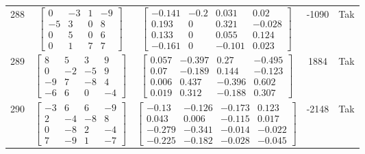 \documentclass[a4paper,12pt]{article}
\begin{document}
\begin{tabular}{c c c c c}
288
&
$\begin{bmatrix} 0 & -3 & 1 & -9 \\ -5 & 3 & 0 & 8 \\ 0 & 5 & 0 & 6 \\ 0 & 1 & 7 & 7 \end{bmatrix}$
&
$\begin{bmatrix} -0.141 & -0.2 & 0.031 & 0.02 \\ 0.193 & 0 & 0.321 & -0.028 \\ 0.133 & 0 & 0.055 & 0.124 \\ -0.161 & 0 & -0.101 & 0.023 \end{bmatrix}$
&
-1090
&
Tak
\\
289
&
$\begin{bmatrix} 8 & 5 & 3 & 9 \\ 0 & -2 & -5 & 9 \\ -9 & 7 & -8 & 4 \\ -6 & 6 & 0 & -4 \end{bmatrix}$
&
$\begin{bmatrix} 0.057 & -0.397 & 0.27 & -0.495 \\ 0.07 & -0.189 & 0.144 & -0.123 \\ 0.006 & 0.437 & -0.396 & 0.602 \\ 0.019 & 0.312 & -0.188 & 0.307 \end{bmatrix}$
&
1884
&
Tak
\\
290
&
$\begin{bmatrix} -3 & 6 & 6 & -9 \\ 2 & -4 & -8 & 8 \\ 0 & -8 & 2 & -4 \\ 7 & -9 & 1 & -7 \end{bmatrix}$
&
$\begin{bmatrix} -0.13 & -0.126 & -0.173 & 0.123 \\ 0.043 & 0.006 & -0.115 & 0.017 \\ -0.279 & -0.341 & -0.014 & -0.022 \\ -0.225 & -0.182 & -0.028 & -0.045 \end{bmatrix}$
&
-2148
&
Tak
\\
\end{tabular} \egroup \newpage
\end{document}
